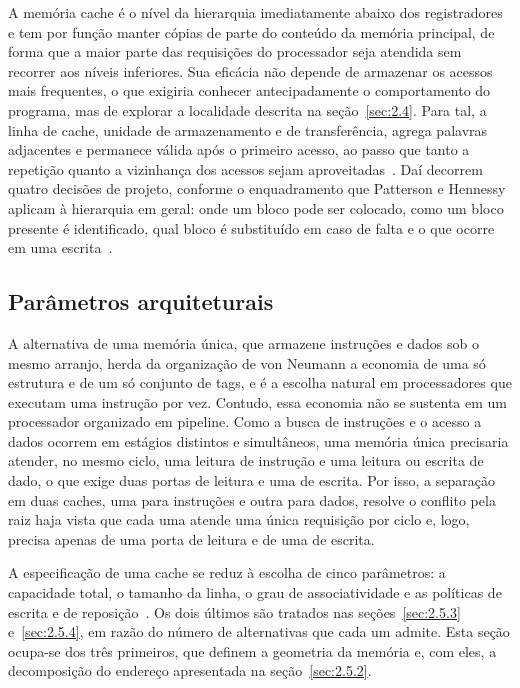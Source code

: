 A memória cache é o nível da hierarquia imediatamente abaixo dos registradores e tem por função manter cópias de parte do conteúdo da memória principal, de forma que a maior parte das requisições do processador seja atendida sem recorrer aos níveis inferiores. Sua eficácia não depende de armazenar os acessos mais frequentes, o que exigiria conhecer antecipadamente o comportamento do programa, mas de explorar a localidade descrita na seção~\ref{sec:2.4}. Para tal, a linha de cache, unidade de armazenamento e de transferência, agrega palavras adjacentes e permanece válida após o primeiro acesso, ao passo que tanto a repetição quanto a vizinhança dos acessos sejam aproveitadas~\cite{patterson2020computer}. Daí decorrem quatro decisões de projeto, conforme o enquadramento que Patterson e Hennessy aplicam à hierarquia em geral: onde um bloco pode ser colocado, como um bloco presente é identificado, qual bloco é substituído em caso de falta e o que ocorre em uma escrita~\cite{patterson2020computer}.

\subsection{Parâmetros arquiteturais}\label{sec:2.5.1}

A alternativa de uma memória única, que armazene instruções e dados sob o mesmo arranjo, herda da organização de von Neumann a economia de uma só estrutura e de um só conjunto de tags, e é a escolha natural em processadores que executam uma instrução por vez. Contudo, essa economia não se sustenta em um processador organizado em pipeline. Como a busca de instruções e o acesso a dados ocorrem em estágios distintos e simultâneos, uma memória única precisaria atender, no mesmo ciclo, uma leitura de instrução e uma leitura ou escrita de dado, o que exige duas portas de leitura e uma de escrita. Por isso, a separação em duas caches, uma para instruções e outra para dados, resolve o conflito pela raiz haja vista que cada uma atende uma única requisição por ciclo e, logo, precisa apenas de uma porta de leitura e de uma de escrita.

A especificação de uma cache se reduz à escolha de cinco parâmetros: a capacidade total, o tamanho da linha, o grau de associatividade e as políticas de escrita e de reposição~\cite{patterson2020computer}. Os dois últimos são tratados nas seções~\ref{sec:2.5.3} e~\ref{sec:2.5.4}, em razão do número de alternativas que cada um admite. Esta seção ocupa-se dos três primeiros, que definem a geometria da memória e, com eles, a decomposição do endereço apresentada na seção~\ref{sec:2.5.2}.

